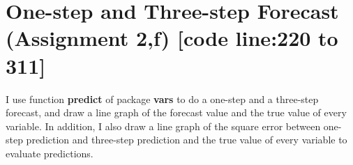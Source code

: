 \documentclass{report}
\begin{document}
\section{One-step and Three-step Forecast (Assignment 2,f) [code line:220 to 311]}

I use function \textbf{predict} of package \textbf{vars} to do a one-step and a three-step forecast, and draw a line graph of the forecast value and the true value of every variable. In addition, I also draw a line graph of the square error between one-step prediction and three-step prediction and the true value of every variable to evaluate predictions.

\begin{figure}[H]
\centering  %



\end{figure}
\end{document}
